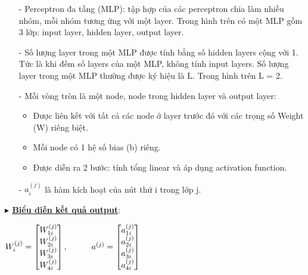 \documentclass{report}
\newcommand\tab[1][1.25cm]{\hspace*{#1}}
\begin{document}
            \begin{enumerate}
                \item [- ] Perceptron đa tầng (MLP): tập hợp của các perceptron chia làm nhiều nhóm, mỗi nhóm tương ứng với một layer. Trong hình trên có một MLP gồm 3 lớp: input layer, hidden layer, output layer.
                \item [- ] Số lượng layer trong một MLP được tính bằng số hidden layers cộng với 1. Tức là khi đếm số layers của một MLP, không tính input layers. Số lượng layer trong một MLP thường được ký hiệu là L. Trong hình trên L = 2.
                \item [- ] Mỗi vòng tròn là một node, node trong hidden layer và output layer:
                    \begin{itemize}
                        \item Được liên kết với tất cả các node ở layer trước đó với các trọng số Weight (W) riêng biệt.
                        \item Mỗi node có 1 hệ số bias (b) riêng.
                        \item Được diễn ra 2 bước: tính tổng linear và áp dụng activation function.
                    \end{itemize}
                \item [- ] $a_i^{(j)}$ là hàm kích hoạt của nút thứ i trong lớp j.
            \end{enumerate}

\pagebreak
            \fontsize{13}{10}\selectfont\textbf{$\blacktriangleright$ \underline{\underline{{Biểu diễn kết quả output}}}}:
            \begin{center}
                $W_i^{(j)} = 
                \begin{bmatrix}
                    W_{1i}^{(j)} \\ W_{2i}^{(j)} \\ W_{3i}^{(j)} \\ W_{4i}^{(j)} \\ 
                \end{bmatrix}, \tab[1cm] a^{(j)} = 
                \begin{bmatrix}
                    a_{1i}^{(j)} \\ a_{2i}^{(j)} \\ a_{3i}^{(j)} \\ a_{4i}^{(j)} \\ 
                \end{bmatrix}$
            \end{center}
            
\end{document}
